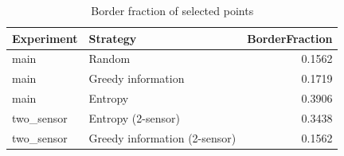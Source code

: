 \begin{table}
\caption{Border fraction of selected points}
\label{tab:border_fraction}
\begin{tabular}{llr}
\toprule
Experiment & Strategy & BorderFraction \\
\midrule
main & Random & 0.1562 \\
main & Greedy information & 0.1719 \\
main & Entropy & 0.3906 \\
two_sensor & Entropy (2-sensor) & 0.3438 \\
two_sensor & Greedy information (2-sensor) & 0.1562 \\
\bottomrule
\end{tabular}
\end{table}
